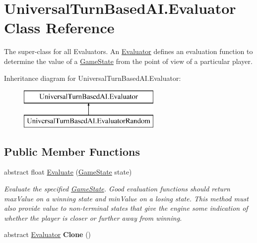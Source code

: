\hypertarget{class_universal_turn_based_a_i_1_1_evaluator}{}\section{Universal\+Turn\+Based\+A\+I.\+Evaluator Class Reference}
\label{class_universal_turn_based_a_i_1_1_evaluator}


The super-\/class for all Evaluators. An \hyperlink{class_universal_turn_based_a_i_1_1_evaluator}{Evaluator} defines an evaluation function to determine the value of a \hyperlink{class_universal_turn_based_a_i_1_1_game_state}{Game\+State} from the point of view of a particular player.  


Inheritance diagram for Universal\+Turn\+Based\+A\+I.\+Evaluator\+:\begin{figure}[H]
\begin{center}
\leavevmode
\includegraphics[height=2.000000cm]{class_universal_turn_based_a_i_1_1_evaluator}
\end{center}
\end{figure}
\subsection*{Public Member Functions}
\begin{DoxyCompactItemize}
\item 
abstract float \hyperlink{class_universal_turn_based_a_i_1_1_evaluator_a949d4c3583870a45dc136f1e46114c99}{Evaluate} (\hyperlink{class_universal_turn_based_a_i_1_1_game_state}{Game\+State} state)
\begin{DoxyCompactList}\small\item\em Evaluate the specified \hyperlink{class_universal_turn_based_a_i_1_1_game_state}{Game\+State}. Good evaluation functions should return max\+Value on a winning state and min\+Value on a losing state. This method must also provide value to non-\/terminal states that give the engine some indication of whether the player is closer or further away from winning. \end{DoxyCompactList}\item 
\hypertarget{class_universal_turn_based_a_i_1_1_evaluator_a6cd4b0d6b6e418edd1af8b524cd9b32b}{}abstract \hyperlink{class_universal_turn_based_a_i_1_1_evaluator}{Evaluator} {\bfseries Clone} ()\label{class_universal_turn_based_a_i_1_1_evaluator_a6cd4b0d6b6e418edd1af8b524cd9b32b}

\end{DoxyCompactItemize}
